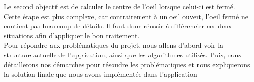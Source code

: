 Le second objectif est de calculer le centre de l'oeil lorsque celui-ci est fermé. Cette étape est plus complexe,
car contrairement à un oeil ouvert, l'oeil fermé ne contient pas beaucoup de détails. Il faut donc réussir à différencier ces
deux situations afin d'appliquer le bon traitement.\\ 

Pour répondre aux problématiques du projet, nous allons d'abord voir la structure actuelle de l'application, ainsi que les algorithmes
utilisés. Puis, nous détaillerons nos démarches pour résoudre les problématiques et nous expliquerons la solution finale que nous avons
implémentée dans l'application.\\

\newpage
